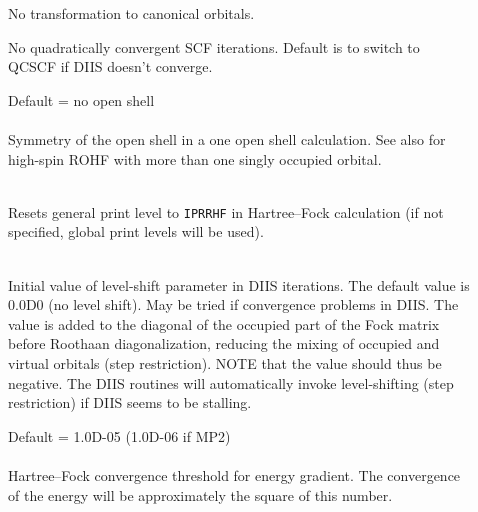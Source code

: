 \begin{description}
\item[]
  No transformation to canonical orbitals.

\item[]
  No quadratically convergent SCF iterations.
  Default is to switch to QCSCF if DIIS doesn't converge.

\item[]
  Default = no open shell\\
   \\
  Symmetry of the open shell in a one open shell
  calculation. See also  for high-spin ROHF with more than one
  singly occupied orbital.

\item[]
   \\
  Resets general print level to \verb|IPRRHF| in Hartree--Fock calculation
  (if not specified, global print levels will be used).

\item[] 
   \\
  Initial value of level-shift parameter in DIIS iterations. 
  The default value is 0.0D0 (no level shift).
  May be tried if convergence problems in DIIS. The value is added
  to the diagonal of the occupied part of the Fock matrix before
  Roothaan diagonalization, reducing the mixing of occupied and
  virtual orbitals (step restriction).
  NOTE that the value should thus be negative.  The DIIS routines
  will automatically invoke level-shifting (step restriction) if
  DIIS seems to be stalling.

\item[]
  Default = 1.0D-05 (1.0D-06 if MP2)\\
   \\
  Hartree--Fock convergence threshold for energy gradient.  The convergence
  of the energy will be approximately the square of this number.

\end{description}



